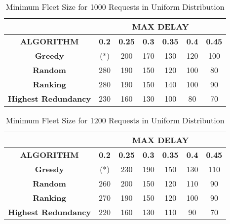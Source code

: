\documentclass[urop]{socreport}
\begin{document}
\begin{table}[h!]
    \centering
    \begin{tabular}{|c|c|c|c|c|c|c|}
        \hline
         & \multicolumn{6}{|c|}{\textbf{MAX DELAY}}\\
         \hline
         \textbf{ALGORITHM} & \textbf{0.2} & \textbf{0.25}& \textbf{0.3}& \textbf{0.35}& \textbf{0.4}& \textbf{0.45}\\
         \hline \hline
         \textbf{Greedy} & (*) & 200 & 170 & 130 & 120 & 100\\
         \hline
         \textbf{Random} & 280 & 190 & 150 & 120 & 100 & 80 \\
         \hline
         \textbf{Ranking} & 280 & 190 & 150 & 140 & 100 & 90 \\
         \hline
         \textbf{Highest Redundancy} & 230 & 160 & 130 & 100 & 80 & 70 \\
        \hline
    \end{tabular}
    \caption{Minimum Fleet Size for 1000 Requests in Uniform Distribution}
    \label{tab:exp1_1000}
\end{table}

\begin{table}[h!]
    \centering
    \begin{tabular}{|c|c|c|c|c|c|c|}
        \hline
         & \multicolumn{6}{|c|}{\textbf{MAX DELAY}}\\
         \hline
         \textbf{ALGORITHM} & \textbf{0.2} & \textbf{0.25}& \textbf{0.3}& \textbf{0.35}& \textbf{0.4}& \textbf{0.45}\\
         \hline \hline
         \textbf{Greedy} & (*) & 230 & 190 & 150 & 130 & 110\\
         \hline
         \textbf{Random} & 260 & 200 & 150 & 120 & 110 & 90 \\
         \hline
         \textbf{Ranking} & 270 & 190 & 150 & 120 & 100 & 90 \\
         \hline
         \textbf{Highest Redundancy} & 220 & 160 & 130 & 110 & 90 & 70 \\
        \hline
    \end{tabular}
    \caption{Minimum Fleet Size for 1200 Requests in Uniform Distribution}
    \label{tab:exp1_1200}
\end{table}
\end{document}
